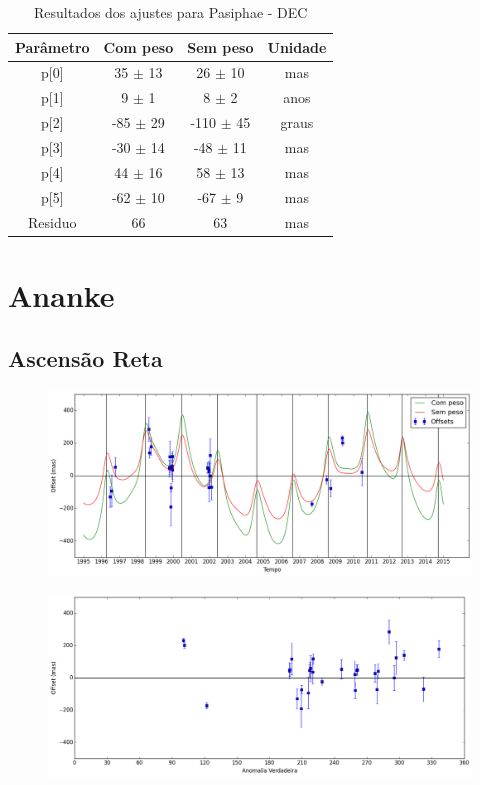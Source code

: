 \documentclass[11pt,a4paper]{report}
\begin{document}
\begin{table}[h!]
\caption{\label{Tab: Pasiphae-DEC} Resultados dos ajustes para Pasiphae - DEC}
\begin{centering}
\begin{tabular}{cccc}
\hline
\hline
Parâmetro & Com peso & Sem peso & Unidade\tabularnewline
\hline
p[0] & 35 $\pm$ 13 & 26 $\pm$ 10 & mas\\
p[1] & 9 $\pm$ 1 & 8 $\pm$ 2 & anos\\
p[2] & -85 $\pm$ 29 & -110 $\pm$ 45 & graus\\
p[3] & -30 $\pm$ 14 & -48 $\pm$ 11 & mas\\
p[4] & 44 $\pm$ 16 & 58 $\pm$ 13 & mas\\
p[5] & -62 $\pm$ 10 & -67 $\pm$ 9 & mas\\
Residuo & 66 & 63 & mas\\
\hline 
\end{tabular} 
\par\end{centering}
\end{table}

\chapter*{Ananke}
\section*{Ascensão Reta}

\begin{figure}[h]
\includegraphics[scale=0.45]{Ananke/RA.png} 
\end{figure}

\begin{figure}[h]
\includegraphics[scale=0.45]{Ananke/RA_anom.png}  
\end{figure}
\end{document}
